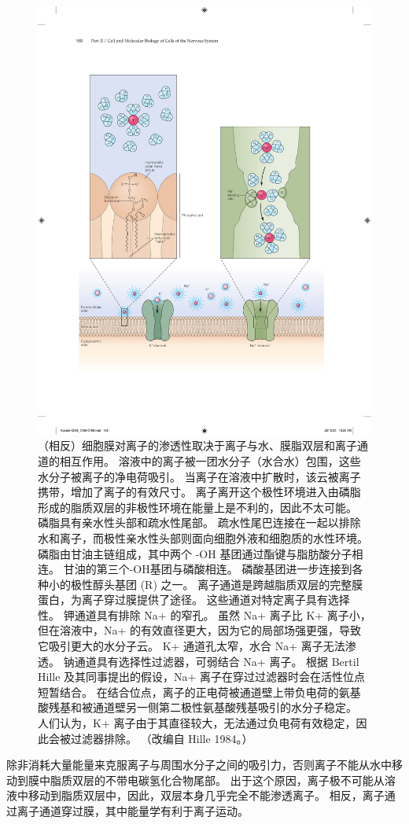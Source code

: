 \begin{figure}[htbp]
	\centering
	\includegraphics[width=0.6\linewidth]{chap08/fig_8_1}
	\caption{（相反）细胞膜对离子的渗透性取决于离子与水、膜脂双层和离子通道的相互作用。 溶液中的离子被一团水分子（水合水）包围，这些水分子被离子的净电荷吸引。 当离子在溶液中扩散时，该云被离子携带，增加了离子的有效尺寸。 离子离开这个极性环境进入由磷脂形成的脂质双层的非极性环境在能量上是不利的，因此不太可能。 磷脂具有亲水性头部和疏水性尾部。 疏水性尾巴连接在一起以排除水和离子，而极性亲水性头部则面向细胞外液和细胞质的水性环境。 磷脂由甘油主链组成，其中两个 -OH 基团通过酯键与脂肪酸分子相连。 甘油的第三个-OH基团与磷酸相连。 磷酸基团进一步连接到各种小的极性醇头基团 (R) 之一。 离子通道是跨越脂质双层的完整膜蛋白，为离子穿过膜提供了途径。 这些通道对特定离子具有选择性。 钾通道具有排除 Na+ 的窄孔。 虽然 Na+ 离子比 K+ 离子小，但在溶液中，Na+ 的有效直径更大，因为它的局部场强更强，导致它吸引更大的水分子云。 K+ 通道孔太窄，水合 Na+ 离子无法渗透。 钠通道具有选择性过滤器，可弱结合 Na+ 离子。 根据 Bertil Hille 及其同事提出的假设，Na+ 离子在穿过过滤器时会在活性位点短暂结合。 在结合位点，离子的正电荷被通道壁上带负电荷的氨基酸残基和被通道壁另一侧第二极性氨基酸残基吸引的水分子稳定。 人们认为，K+ 离子由于其直径较大，无法通过负电荷有效稳定，因此会被过滤器排除。 （改编自 Hille 1984。）}
	\label{fig:8_1}
\end{figure}


除非消耗大量能量来克服离子与周围水分子之间的吸引力，否则离子不能从水中移动到膜中脂质双层的不带电碳氢化合物尾部。
出于这个原因，离子极不可能从溶液中移动到脂质双层中，因此，双层本身几乎完全不能渗透离子。
相反，离子通过离子通道穿过膜，其中能量学有利于离子运动。


